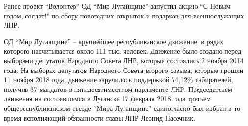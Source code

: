 Ранее проект \enquote{Волонтер} ОД \enquote{Мир Луганщине} запустил акцию \enquote{С Новым годом,
солдат!} по сбору новогодних открыток и подарков для военнослужащих ЛНР.

ОД \enquote{Мир Луганщине} – крупнейшее республиканское движение, в рядах которого
насчитывается около 111 тыс. человек. Движение было создано перед выборами
депутатов Народного Совета ЛНР, которые состоялись 2 ноября 2014 года. На
выборах депутатов Народного Совета второго созыва, которые прошли 11 ноября
2018 года, движение заручилось поддержкой 74,12\% избирателей, получив 37
мандатов в пятидесятиместном парламенте ЛНР. Председателем движения на
состоявшемся в Луганске 17 февраля 2018 года третьем общереспубликанском съезде
\enquote{Мира Луганщине} единогласно был избран в то время исполняющий обязанности
главы ЛНР Леонид Пасечник.
